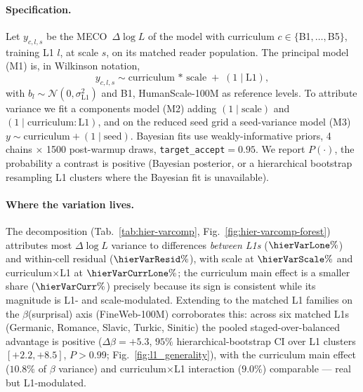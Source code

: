 \paragraph{Specification.} Let $y_{c,l,s}$ be the MECO~$\Delta\log L$ of the model with curriculum $c\in\{$B1$,\dots,$B5$\}$, training L1 $l$, at scale $s$, on its matched reader population. The principal model (M1) is, in Wilkinson notation,
\begin{equation}
y_{c,l,s} \sim \mathrm{curriculum}\,*\,\mathrm{scale} \;+\; (1 \mid \mathrm{L1}),
\label{eq:hier-m1}
\end{equation}
with $b_l\sim\mathcal{N}(0,\sigma^2_{\mathrm{L1}})$ and B1, HumanScale-100M as reference levels. To attribute variance we fit a components model (M2) adding $(1\mid\mathrm{scale})$ and $(1\mid\mathrm{curriculum{:}L1})$, and on the reduced seed grid a seed-variance model (M3) $y\sim\mathrm{curriculum}+(1\mid\mathrm{seed})$. Bayesian fits use weakly-informative priors, 4 chains $\times$ 1500 post-warmup draws, \texttt{target\_accept}${=}0.95$. We report $P(\cdot)$, the probability a contrast is positive (Bayesian posterior, or a hierarchical bootstrap resampling L1 clusters where the Bayesian fit is unavailable).
 
\paragraph{Where the variation lives.} The decomposition (Tab.~\ref{tab:hier-varcomp}, Fig.~\ref{fig:hier-varcomp-forest}) attributes most $\Delta\log L$ variance to differences \emph{between L1s} ($\hierVarLone\%$) and within-cell residual ($\hierVarResid\%$), with scale at $\hierVarScale\%$ and curriculum$\times$L1 at $\hierVarCurrLone\%$; the curriculum main effect is a smaller share ($\hierVarCurr\%$) precisely because its sign is consistent while its magnitude is L1- and scale-modulated. Extending to the matched L1 families on the $\beta$(surprisal) axis (FineWeb-100M) corroborates this: across six matched L1s (Germanic, Romance, Slavic, Turkic, Sinitic) the pooled staged-over-balanced advantage is positive ($\Delta\beta=+5.3$, $95\%$ hierarchical-bootstrap CI over L1 clusters $[+2.2,+8.5]$, $P{>}0.99$; Fig.~\ref{fig:l1_generality}), with the curriculum main effect ($10.8\%$ of $\beta$ variance) and curriculum$\times$L1 interaction ($9.0\%$) comparable --- real but L1-modulated.
 

